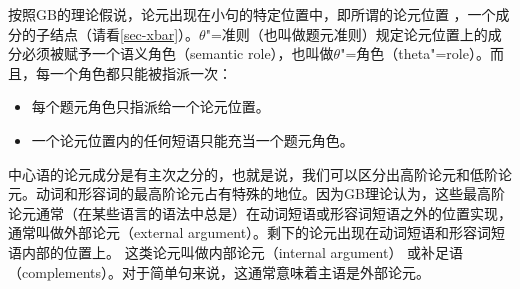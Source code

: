 按照GB的理论假说，论元出现在小句的特定位置中，即所谓的论元位置 ，\egc 一个\xnullc 成分的子结点（请看\ref{sec-xbar}）。$\theta$"=准则（也叫做题元准则）规定论元位置上的成分必须被赋予一个语义角色（semantic role），也叫做$\theta$"=角色（theta"=role）。而且，每一个角色都只能被指派一次\citep[]{Chomsky81a}：
\begin{principle-break}[$\theta$"=准则]\label{theta-Kriterium}
\begin{itemize}
\item 每个题元角色只指派给一个论元位置。
\item 一个论元位置内的任何短语只能充当一个题元角色。
\end{itemize}
\end{principle-break}
\noindent
%

中心语的论元成分是有主次之分的，也就是说，我们可以区分出高阶论元和低阶论元。动词和形容词的最高阶论元占有特殊的地位。因为GB理论认为，这些最高阶论元通常（在某些语言的语法中总是）在动词短语或形容词短语之外的位置实现，通常叫做外部论元（external argument）。剩下的论元出现在动词短语和形容词短语内部的位置上。
  这类论元叫做内部论元（internal argument） 或补足语（complements）。对于简单句来说，这通常意味着主语是外部论元。

